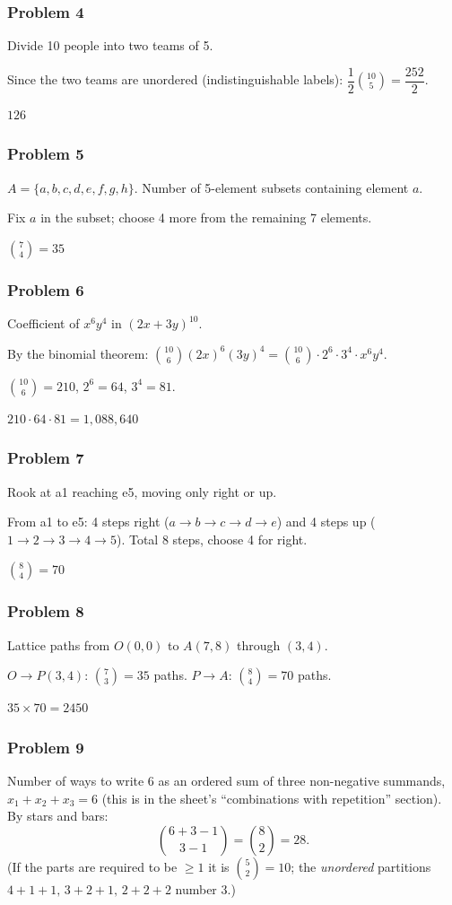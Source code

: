 \subsubsection*{Problem 4}
Divide 10 people into two teams of 5.

Since the two teams are unordered (indistinguishable labels):
$\dfrac{1}{2}\binom{10}{5} = \dfrac{252}{2}$.

$\boxed{126}$

\subsubsection*{Problem 5}
$A=\{a,b,c,d,e,f,g,h\}$. Number of 5-element subsets containing element $a$.

Fix $a$ in the subset; choose 4 more from the remaining 7 elements.

$\boxed{\binom{7}{4} = 35}$

\subsubsection*{Problem 6}
Coefficient of $x^6 y^4$ in $(2x+3y)^{10}$.

By the binomial theorem: $\binom{10}{6}(2x)^6(3y)^4 = \binom{10}{6}\cdot 2^6\cdot 3^4\cdot x^6 y^4$.

$\binom{10}{6}=210$, $2^6=64$, $3^4=81$.

$\boxed{210\cdot 64\cdot 81 = 1{,}088{,}640}$

\subsubsection*{Problem 7}
Rook at a1 reaching e5, moving only right or up.

From a1 to e5: 4 steps right ($a\to b\to c\to d\to e$) and 4 steps up ($1\to2\to3\to4\to5$). Total 8 steps, choose 4 for right.

$\boxed{\binom{8}{4} = 70}$

\subsubsection*{Problem 8}
Lattice paths from $O(0,0)$ to $A(7,8)$ through $(3,4)$.

$O\to P(3,4)$: $\binom{7}{3}=35$ paths. $P\to A$: $\binom{8}{4}=70$ paths.

$\boxed{35\times 70 = 2450}$

\subsubsection*{Problem 9}
Number of ways to write 6 as an ordered sum of three non-negative summands, $x_1+x_2+x_3=6$ (this is in the sheet's ``combinations with repetition'' section). By stars and bars:
\[ \binom{6+3-1}{3-1} = \binom{8}{2} = \boxed{28}. \]
(If the parts are required to be $\ge 1$ it is $\binom{5}{2}=10$; the \emph{unordered} partitions $4{+}1{+}1,\,3{+}2{+}1,\,2{+}2{+}2$ number $3$.)

